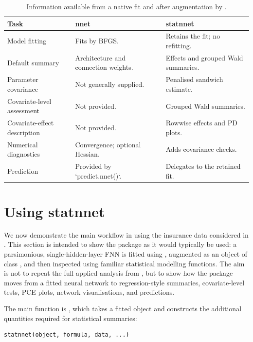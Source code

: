 \begin{table}

\caption{\label{tab:nnet-comparison-table}Information available from a native  fit and after augmentation by .}
\centering
\begin{tabular}[t]{l|l|l}
\hline
Task & nnet & statnnet\\
\hline
Model fitting & Fits by BFGS. & Retains the fit; no refitting.\\
\hline
Default summary & Architecture and connection weights. & Effects and grouped Wald summaries.\\
\hline
Parameter covariance & Not generally supplied. & Penalised sandwich estimate.\\
\hline
Covariate-level assessment & Not provided. & Grouped Wald summaries.\\
\hline
Covariate-effect description & Not provided. & Rowwise effects and PD plots.\\
\hline
Numerical diagnostics & Convergence; optional Hessian. & Adds covariance checks.\\
\hline
Prediction & Provided by `predict.nnet()`. & Delegates to the retained fit.\\
\hline
\end{tabular}
\end{table}

\section{Using statnnet}\label{sec:using-statnnet}

We now demonstrate the main workflow in  using the insurance data considered in \citet{mcinerney2023feedforward}.
This section is intended to show the package as it would typically be used: a parsimonious, single-hidden-layer FNN is fitted using , augmented as an object of class , and then inspected using familiar statistical modelling functions.
The aim is not to repeat the full applied analysis from \citet{mcinerney2023feedforward}, but to show how the package moves from a fitted neural network to regression-style summaries, covariate-level tests, PCE plots, network visualisations, and predictions.

The main function is , which takes a fitted  object and constructs the additional quantities required for statistical summaries:

\begin{verbatim}
statnnet(object, formula, data, ...)
\end{verbatim}

